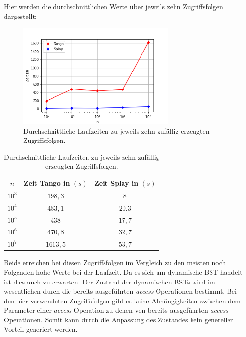\documentclass[a4paper,12pt]{article}
\begin{document}
\noindent Hier werden die durchschnittlichen Werte über jeweils zehn Zugriffsfolgen dargestellt:
\begin{figure}[H]
	\centering
	\includegraphics[width=0.7\textwidth]{Medien/laufzeittest/diagramm/randomaccess3}
	\caption{Durchschnittliche Laufzeiten zu jeweils zehn zufällig erzeugten Zugriffsfolgen.}
	
\end{figure}
\begin{table}[H]
	\begin{center}
		\begin{tabular}[c]{|c|c|c|}
			\hline
			$n$ & Zeit Tango in $\left(s\right)$ &Zeit Splay in $\left(s\right)$ \\
			\hline
			$10^3$ & $198,3$ &$8$ \\
			\hline
			$10^4$  & $483,1$ &$20.3$  \\
			\hline
			$10^5$  & $438$ &$17,7$  \\
			\hline
			$10^6$  & $470,8$ &$32,7$  \\
			\hline
			$10^7$  & $1613,5$ &$53,7$  \\
			\hline
		\end{tabular}
		\caption{Durchschnittliche Laufzeiten zu jeweils zehn zufällig erzeugten Zugriffsfolgen.} 
	\end{center}
\end{table}
\noindent Beide erreichen bei diesen Zugriffsfolgen im Vergleich zu den meisten noch Folgenden hohe Werte bei der Laufzeit. Da es sich um dynamische BST handelt ist dies auch zu erwarten. Der Zustand der dynamischen BSTs wird im wesentlichen durch  die  bereits ausgeführten \textit{access} Operationen bestimmt. Bei den hier verwendeten Zugriffsfolgen gibt es keine Abhängigkeiten zwischen dem Parameter einer \textit{access} Operation zu denen von bereits ausgeführten \textit{access} Operationen. Somit kann durch die Anpassung des Zustandes kein genereller Vorteil generiert werden.\\
\end{document}

